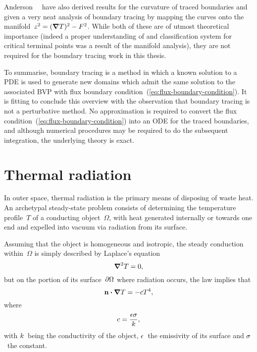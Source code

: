 Anderson~\etal~\cite{anderson-2007-boundary-tracing-i-theory}
have also derived results for the curvature of traced boundaries
and given a very neat analysis of boundary tracing
by mapping the curves onto the manifold~$z^2 = (\mathop{}\!\boldsymbol{\mathrm{\nabla}} T)^2 - F^2$.
While both of these are of utmost theoretical importance
(indeed a proper understanding of and classification system for
critical terminal points was a result of the manifold analysis),
they are not required for the boundary tracing work in this thesis.

To summarise, boundary tracing is a method in which
a known solution to a PDE is used
to generate new domains which admit the same solution
to the associated BVP
with flux boundary condition~(\ref{eq:flux-boundary-condition}).
It is fitting to conclude this overview with the observation that
boundary tracing is not a perturbative method.
No approximation is required
to convert the flux condition~(\ref{eq:flux-boundary-condition})
into an ODE for the traced boundaries,
and although numerical procedures may be required
to do the subsequent integration,
the underlying theory is exact.

\section{Thermal radiation}
\label{sec:introduction.radiation}

In outer space,
thermal radiation is the primary means of disposing of waste heat.
An archetypal steady-state problem consists of
determining the temperature profile~$T$ of a conducting object~$\Omega$,
with heat generated internally or towards one end
and expelled into vacuum via radiation from its surface.

Assuming that the object is homogeneous and isotropic,
the steady conduction within~$\Omega$
is simply described by Laplace's equation
\begin{equation}
  \mathop{}\!\boldsymbol{\mathrm{\nabla}}^2 T = 0,
  \label{eq:laplace-steady-conduction}
\end{equation}
but on the portion of its surface~$\mathop{}\!\partial \Omega$ where radiation occurs,
the \stefanboltz{} law implies that
\begin{equation}
  \mathop{}\!\boldsymbol{\mathrm{n}} \boldsymbol{\cdot} \mathop{}\!\boldsymbol{\mathrm{\nabla}} T = - c T^4,
  \label{eq:radiation-boundary-condition}
\end{equation}
where
\begin{equation}
  c = \frac{\epsilon \sigma}{k},
  \label{eq:radiation-constant}
\end{equation}
with $k$~being the conductivity of the object,
$\epsilon$~the emissivity of its surface
and $\sigma$~the \stefanboltz{} constant.


